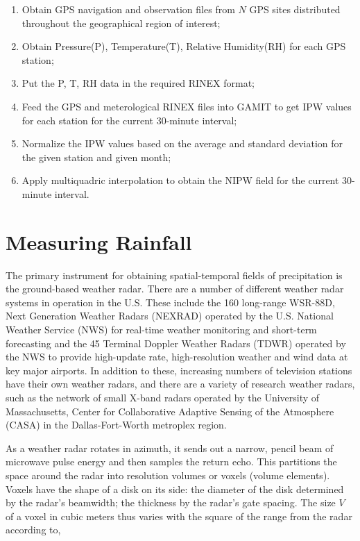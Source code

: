 \documentclass[proposal]{umassthesis}
\begin{document}
{\begin{enumerate}
\item Obtain GPS navigation and observation files from $N$ GPS sites distributed throughout the geographical region of interest;
\item Obtain Pressure(P), Temperature(T), Relative Humidity(RH) for each GPS station;
\item Put the P, T, RH data in the required RINEX format;
\item Feed the GPS and meterological RINEX files into GAMIT to get IPW values for each station for the current 30-minute interval;
\item Normalize the IPW values based on the average and standard deviation for the given station and given month;
\item Apply multiquadric interpolation to obtain the NIPW field for the current 30-minute interval.
\end{enumerate}

\section{Measuring Rainfall}

The primary instrument for obtaining spatial-temporal fields of precipitation is the ground-based weather radar. There are a number of different weather radar systems in operation in the U.S. These include the 160 long-range WSR-88D, Next Generation Weather Radars (NEXRAD) operated by the U.S. National Weather Service (NWS) for real-time weather monitoring and short-term forecasting and the 45 Terminal Doppler Weather Radars (TDWR) operated by the NWS to provide high-update rate, high-resolution weather and wind data at key major airports. In addition to these, increasing numbers of television stations have their own weather radars, and there are a variety of research weather radars, such as the network of small X-band radars operated by the University of Massachusetts, Center for Collaborative Adaptive Sensing of the Atmosphere (CASA) in the Dallas-Fort-Worth metroplex region.

As a weather radar rotates in azimuth, it sends out a narrow, pencil beam of microwave pulse energy and then samples the return echo. This partitions the space around the radar into resolution volumes or voxels (volume elements). Voxels have the shape of a disk on its side: the diameter of the disk determined by the radar's beamwidth; the thickness by the radar's gate spacing. The size $V$ of a voxel in cubic meters thus varies with the square of the range from the radar according to,

}
\end{document}
